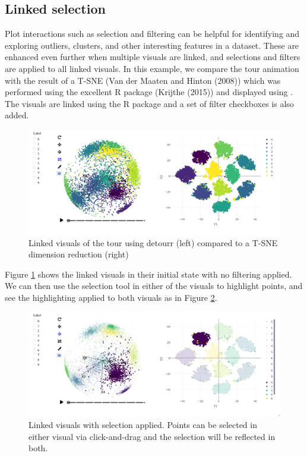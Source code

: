 \hypertarget{linked-selection}{%
\subsection{Linked selection}\label{linked-selection}}

Plot interactions such as selection and filtering can be helpful for identifying and exploring outliers, clusters, and other interesting features in a dataset. These are enhanced even further when multiple visuals are linked, and selections and filters are applied to all linked visuals. In this example, we compare the tour animation with the result of a T-SNE (Van der Maaten and Hinton (2008)) which was performed using the excellent  R package (Krijthe (2015)) and displayed using . The visuals are linked using the R package  and a set of filter checkboxes is also added.

\begin{figure}
\includegraphics[width=\textwidth]{figures/mnist/case-study-linked-brushing-full} \caption{Linked visuals of the tour using detourr (left) compared to a T-SNE dimension reduction (right)}\label{fig:linked-tsne-full}
\end{figure}

Figure \ref{fig:linked-tsne-full} shows the linked visuals in their initial state with no filtering applied. We can then use the selection tool in either of the visuals to highlight points, and see the highlighting applied to both visuals as in Figure \ref{fig:linked-tsne-selection}.

\begin{figure}
\includegraphics[width=\textwidth]{figures/mnist/case-study-linked-brushing-selection} \caption{Linked visuals with selection applied. Points can be selected in either visual via click-and-drag and the selection will be reflected in both.}\label{fig:linked-tsne-selection}
\end{figure}

